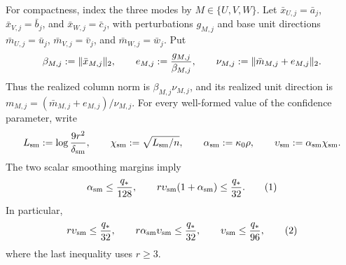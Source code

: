 For compactness, index the three modes by $M\in\{U,V,W\}$. Let
$\bar x_{U,j}=\bar a_j$, $\bar x_{V,j}=\bar b_j$, and
$\bar x_{W,j}=\bar c_j$, with perturbations $g_{M,j}$ and base unit
directions $\bar m_{U,j}=\bar u_j$,
$\bar m_{V,j}=\bar v_j$, and
$\bar m_{W,j}=\bar w_j$. Put
\[
\beta_{M,j}:=\|\bar x_{M,j}\|_2,\qquad
e_{M,j}:={g_{M,j}\over\beta_{M,j}},\qquad
\nu_{M,j}:=\|\bar m_{M,j}+e_{M,j}\|_2.
\]
Thus the realized column norm is $\beta_{M,j}\nu_{M,j}$, and its
realized unit direction is
$m_{M,j}=(\bar m_{M,j}+e_{M,j})/\nu_{M,j}$.
For every well-formed value of the confidence parameter, write
\[
L_{\rm sm}:=\log {9r^2\over\delta_{\rm sm}},\qquad
\chi_{\rm sm}:=\sqrt{L_{\rm sm}/n},\qquad
\alpha_{\rm sm}:=\kappa _0\rho,\qquad
\upsilon_{\rm sm}:=\alpha_{\rm sm}\chi_{\rm sm}.
\]
The two scalar smoothing margins imply
\[
\alpha_{\rm sm}\le {q_*\over128},\qquad
r\upsilon_{\rm sm}(1+\alpha_{\rm sm})\le {q_*\over32}.
\tag{1}
\]
In particular,
\[
r\upsilon_{\rm sm}\le {q_*\over32},\qquad
r\alpha_{\rm sm}\upsilon_{\rm sm}\le {q_*\over32},\qquad
\upsilon_{\rm sm}\le {q_*\over96},
\tag{2}
\]
where the last inequality uses $r\ge3$.



